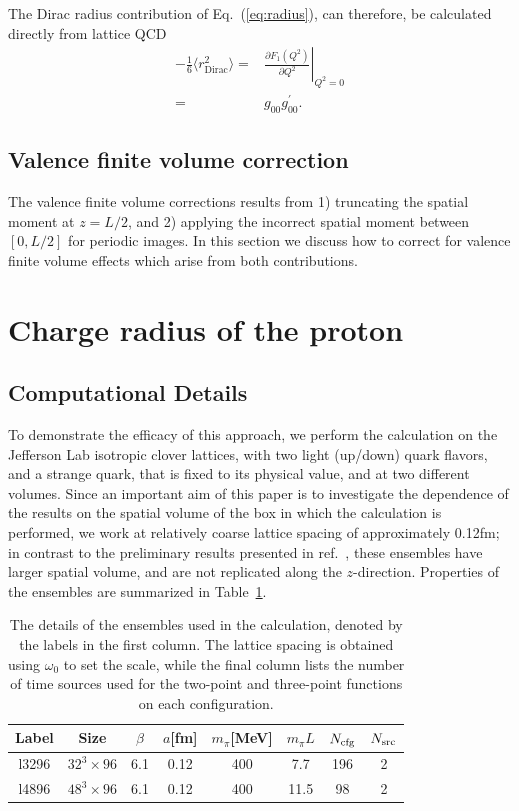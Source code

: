 \documentclass[prd,aps,twocolumn,superscriptaddress,tightenlines,nofootinbib,floatfix,preprintnumbers,10pt]{revtex4-1}
\begin{document}
The Dirac radius contribution of Eq.~(\ref{eq:radius}), can therefore, be calculated directly from lattice QCD
\begin{align}
 -\frac{1}{6}\langle r_{\mathrm{Dirac}}^2 \rangle =& \left. \frac{\partial F_1(Q^2)}{\partial
	Q^2}\right|_{Q^2=0}\nonumber \\
=&g_{00} g^\prime_{00}.
\end{align}

\subsection{Valence finite volume correction}
The valence finite volume corrections results from 1) truncating the spatial moment at $z=L/2$, and 2) applying the incorrect spatial moment between $[0,L/2]$ for periodic images. In this section we discuss how to correct for valence finite volume effects which arise from both contributions.



\section{Charge radius of the proton}\label{sec:results}

\subsection{Computational Details}
To demonstrate the efficacy of this approach, we perform the
calculation on the Jefferson Lab isotropic clover lattices, with two light
(up/down) quark flavors, and a strange quark, that is fixed to its
physical value, and at two different volumes.  Since an important aim
of this paper is to investigate the dependence of the results on the
spatial volume of the box in which the calculation is performed, we
work at relatively coarse lattice spacing of approximately 0.12fm; in contrast to the
preliminary results presented in ref.~\cite{Bouchard:2016gmc}, these
ensembles have larger spatial volume, and are not replicated along the $z$-direction.  Properties of the ensembles are summarized in Table~\ref{tab:cfg}.
\begin{table}
  \begin{tabular}{cccccccc}
  	\hline\hline
    Label & Size & $\beta$ & $a$[fm] & $m_\pi$[MeV] & $m_\pi L$ & $N_{\rm cfg}$ & $N_{\rm src}$\\
    \hline
    l3296 & $32^3 \times 96$ & 6.1 & 0.12 & 400 & 7.7 & 196 & 2\\
    l4896 & $48^3 \times 96$ & 6.1 & 0.12 & 400 & 11.5 & 98 & 2\\
    \hline\hline
  \end{tabular}
  \caption{The details of the ensembles used in the calculation, denoted by the labels in the first column.  The
    lattice spacing is obtained using $\omega_0$ to set the scale,
    while the final column lists the number of time sources used for
    the two-point and three-point functions on each
    configuration.\label{tab:cfg}}
\end{table}
\end{document}
